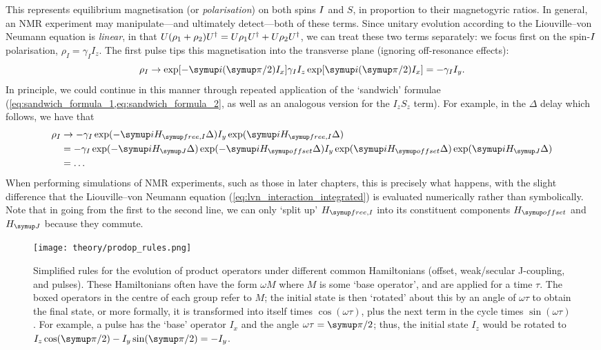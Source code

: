 This represents equilibrium magnetisation (or \textit{polarisation}) on both spins $I\/$ and $S$, in proportion to their magnetogyric ratios.
In general, an NMR experiment may manipulate---and ultimately detect---both of these terms.
Since unitary evolution according to the Liouville--von Neumann equation is \textit{linear}, in that $U(\rho_1 + \rho_2)U^\dagger = U\rho_1U^\dagger + U\rho_2U^\dagger$, we can treat these two terms separately: we focus first on the spin-$I\/$ polarisation, $\rho_I = \gamma_I I_z$.
The first  \proton{} pulse tips this magnetisation into the transverse plane (ignoring off-resonance effects):
\begin{equation}
    \label{eq:rho_after_pulse_x}
    \rho_I \to \exp[-\mi(\cpi/2) I_x] \gamma_I I_z \exp[\mi(\cpi/2) I_x] = -\gamma_I I_y.
\end{equation}
In principle, we could continue in this manner through repeated application of the `sandwich' formulae (\cref{eq:sandwich_formula_1,eq:sandwich_formula_2}, as well as an analogous version for the $I_zS_z$ term). 
For example, in the $\Delta$ delay which follows, we have that
\begin{equation}
    \label{eq:rho_after_delay_x}
    \begin{aligned}
        \rho_I &\to -\gamma_I\exp(-\mi\HfreeI\Delta) I_y \exp(\mi\HfreeI\Delta) \\
               &= -\gamma_I\exp(-\mi\HJ\Delta)\exp(-\mi\Hoffset\Delta) I_y \exp(\mi\Hoffset\Delta)\exp(\mi\HJ\Delta) \\
               &= \ldots
    \end{aligned}
\end{equation}
When performing simulations of NMR experiments, such as those in later chapters, this is precisely what happens, with the slight difference that the Liouville--von Neumann equation (\cref{eq:lvn_interaction_integrated}) is evaluated numerically rather than symbolically.
Note that in going from the first to the second line, we can only `split up' $\HfreeI$ into its constituent components $\Hoffset$ and $\HJ$ because they commute.

\begin{figure}[htbp]
    \centering
    \texttt{[image: theory/prodop\_rules.png]}%
    \caption[Simplified rules for product operator evolutions]{
        Simplified rules for the evolution of product operators under different common Hamiltonians (offset, weak/secular J-coupling, and pulses).
        These Hamiltonians often have the form $\omega M$ where $M$ is some `base operator', and are applied for a time $\tau$.
        The boxed operators in the centre of each group refer to $M$; the initial state is then `rotated' about this by an angle of $\omega\tau$ to obtain the final state, or more formally, it is transformed into itself times $\cos(\omega\tau)$, plus the next term in the cycle times $\sin(\omega\tau)$.
        For example, a  pulse has the `base' operator $I_x$ and the angle $\omega\tau = \cpi/2$; thus, the initial state $I_z$ would be rotated to $I_z\cos(\cpi/2) - I_y\sin(\cpi/2) = -I_y$.
    }
    \label{fig:prodop_rules}
\end{figure}

